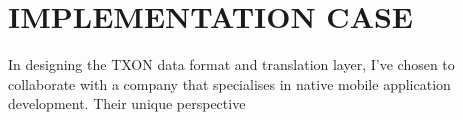 \documentclass[../report.tex]{subfiles}
\begin{document}
\section{IMPLEMENTATION CASE} \label{sec:case}


In designing the TXON data format and translation layer, I've chosen to collaborate with a company that specialises in native mobile application development. Their unique perspective
\end{document}
